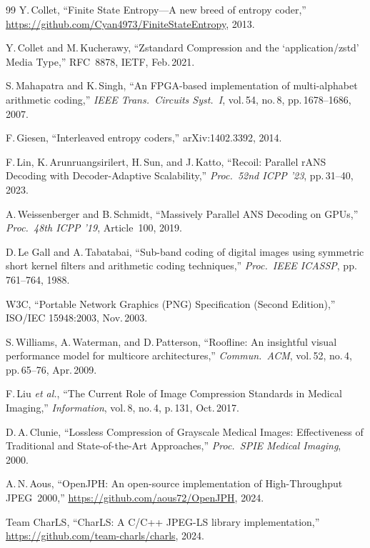 \documentclass[journal]{IEEEtran}
\begin{document}
\begin{thebibliography}{99}
Y.\,Collet, ``Finite State Entropy---A new breed of entropy coder,''
\url{https://github.com/Cyan4973/FiniteStateEntropy}, 2013.

Y.\,Collet and M.\,Kucherawy,
``Zstandard Compression and the `application/zstd' Media Type,''
RFC~8878, IETF, Feb.\,2021.

S.\,Mahapatra and K.\,Singh,
``An FPGA-based implementation of multi-alphabet arithmetic coding,''
\textit{IEEE Trans.\ Circuits Syst.\ I}, vol.\,54, no.\,8, pp.\,1678--1686,
2007.

F.\,Giesen, ``Interleaved entropy coders,'' arXiv:1402.3392, 2014.

F.\,Lin, K.\,Arunruangsirilert, H.\,Sun, and J.\,Katto,
``Recoil: Parallel rANS Decoding with Decoder-Adaptive Scalability,''
\textit{Proc.\ 52nd ICPP '23}, pp.\,31--40, 2023.

A.\,Weissenberger and B.\,Schmidt,
``Massively Parallel ANS Decoding on GPUs,''
\textit{Proc.\ 48th ICPP '19}, Article~100, 2019.

D.\,Le Gall and A.\,Tabatabai,
``Sub-band coding of digital images using symmetric short kernel filters and
arithmetic coding techniques,'' \textit{Proc.\ IEEE ICASSP}, pp.\,761--764,
1988.

W3C, ``Portable Network Graphics (PNG) Specification (Second Edition),''
ISO/IEC 15948:2003, Nov.\,2003.

S.\,Williams, A.\,Waterman, and D.\,Patterson,
``Roofline: An insightful visual performance model for multicore
architectures,''
\textit{Commun.\ ACM}, vol.\,52, no.\,4, pp.\,65--76, Apr.\,2009.

F.\,Liu \textit{et al.},
``The Current Role of Image Compression Standards in Medical Imaging,''
\textit{Information}, vol.\,8, no.\,4, p.\,131, Oct.\,2017.

D.\,A.\,Clunie,
``Lossless Compression of Grayscale Medical Images: Effectiveness of
Traditional and State-of-the-Art Approaches,''
\textit{Proc.\ SPIE Medical Imaging}, 2000.

A.\,N.\,Aous,
``OpenJPH: An open-source implementation of High-Throughput JPEG~2000,''
\url{https://github.com/aous72/OpenJPH}, 2024.

Team CharLS,
``CharLS: A C/C++ JPEG-LS library implementation,''
\url{https://github.com/team-charls/charls}, 2024.


\end{thebibliography}
\end{document}
